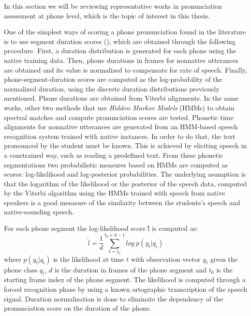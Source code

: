 In this section we will be reviewing representative works in pronunciation assessment
at phone level, which is the topic of interest in this thesis.

One of the simplest ways of scoring a phone pronunciation found in the literature 
is to use segment duration scores (\cite{pronunciation_scoring_instruction, pronunciation_scoring_phone_segments_instruction}), which are obtained through the following
procedure. First, a duration distribution is generated for each phone
using the native training data. 
Then, phone durations in frames for nonnative utterances are obtained 
and its value is normalized to compensate for rate of speech. 
Finally, phone-segment-duration scores are computed as 
the log-probability of the normalized duration, using the discrete duration 
distributions previously mentioned. Phone durations are obtained from Viterbi alignments.
In the same works, other two methods that use \textit{Hidden Markov Models} (HMMs) to obtain 
spectral matches and compute pronunciation scores are tested. 
Phonetic time alignments for
nonnative utterances are generated from an HMM-based speech recognition system trained
with native instances. In order to do that, the text pronounced by the student 
must be known. This is achieved by eliciting speech in a
constrained way, such as reading a predefined text.
From these phonetic segmentations two 
probabilistic measures based on HMMs are computed as scores: log-likelihood and 
log-posterior probabilities. The underlying asumption is that the logarithm of the likelihood
or the posterior of the speech data, computed by the Viterbi 
algorithm using the HMMs trained with speech from native
speakers is a good mesasure of the similarity between the students's
speech and native-sounding speech.

For each phone segment the log-likelihood score \^{l} is computed as:
\begin{equation}
\label{eq:logLikelihood}
\hat{l} = \frac{1}{d} \sum_{t=t_{0}}^{t_{0}+d-1} log \ p(y_{t}|q_{i})
\end{equation}
where $p(y_{t}|q_{i})$ is the likelihood at time $t$ with observation vector $y_{t}$
given the phone class $q_{i}$, $d$ is the duration in frames of the phone segment 
and $t_{0}$ is the starting frame index of the phone segment. 
The likelihood is computed through a forced recognition phase by using a known ortographic
transcription of the speech signal. Duration normalization is done to 
eliminate the dependency of the pronunciation score on the duration of the phone.

